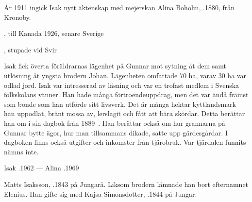 År 1911 ingick Isak nytt äktenskap med mejerskan Alina Boholm, .1880, från Kronoby.
\begin{jhchildren}
  \item {}, till Kanada 1926, senare Sverige
  \item {}
  \item {}
  \item {}
  \item {}, stupade vid Svir
  \item {}
\end{jhchildren}

Isak fick överta föräldrarnas lägenhet på Gunnar mot sytning åt dem samt utlösning åt yngsta brodern Johan. Lägenheten omfattade 70 ha, varav 30 ha var odlad jord. Isak var intresserad av läsning och var en trofast medlem i Svenska folkskolans vänner. Han hade många förtroendeuppdrag, men det var ändå främst som bonde som han utförde sitt livsverk. Det är många hektar kyttlandsmark han uppodlat, bränt mossa av, lerslagit och fått att bära skördar. Detta berättar han om i sin dagbok från 1889--. Han berättar också om  hur grannarna på Gunnar bytte ägor, hur man tillsammans dikade, satte upp gärdesgårdar. I dagboken finns också utgifter och inkomster från tjärobruk. Var tjärdalen funnits nämns	inte.

Isak .1962  ---  Alina .1969


%
Matts Isaksson, .1843 på Jungarå. Liksom brodern lämnade han bort efternamnet Elenius. Han gifte sig med Kajsa Simonsdotter,	.1844 på Jungar.
\begin{jhchildren}
  \item {}
  \item {}
  \item {}
  \item {}
  \item {}
  \item {}
  \item {}
  \item {}
\end{jhchildren}

